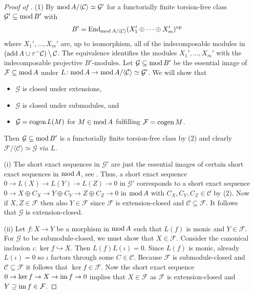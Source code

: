 \documentclass[a4paper]{amsart}
\newcommand{\op}{\textnormal{op}}
\renewcommand{\mod}{\textnormal{mod}\,}
\newcommand{\im}{\textnormal{im}\,}
\newcommand{\add}{\textnormal{add}\,}
\newcommand{\cogen}{\textnormal{cogen}\,}
\numberwithin{equation}{section} \theoremstyle{plain}
\numberwithin{thm}{section}
\begin{document}
\begin{proof}[Proof of ]  (1) By \cite[Theorem 5.1]{enomoto} $\mod A / \langle \mathcal{C} \rangle\simeq \mathcal{G}'$ for a functorially finite torsion-free class $\mathcal{G}' \subseteq \mod B'$ with 
\begin{align*}
B' = \mathrm{End}_{\mod A/\langle \mathcal{C} \rangle} (X_1' \oplus \dots \oplus X_m')^\op     
\end{align*}
where $X_1', \dots , X_m'$ are, up to isomorphism, all of the indecomposable modules in $(\add A \cup \tau^- \mathcal{C})\setminus \mathcal{C}$. The equivalence identifies the modules $X_1', \dots, X_m'$ with the indecomposable projective $B'$-modules. Let $\mathcal{G}\subseteq \mod B'$ be the essential image of $\mathcal{F} \subseteq \mod A$ under $L\colon \mod A \to \mod A / \langle \mathcal{C} \rangle \simeq \mathcal{G}'$. We will show that
\begin{itemize}
    \item[(i)] $\mathcal{G}$ is closed under extensions,
    \item[(ii)] $\mathcal{G}$ is closed under submodules, and
    \item[(iii)] $\mathcal{G} = \cogen L(M)$ for $M \in \mod A$ fulfilling $\mathcal{F} = \cogen M$.
\end{itemize}
Then $\mathcal{G} \subseteq \mod B'$ is a functorially finite torsion-free class by  (2) and clearly $\mathcal{F}/\langle \mathcal{C} \rangle \simeq \mathcal{G}$ via $L$. 

(i) The short exact sequences in $\mathcal{G}'$ are just the essential images of certain short exact sequences in $\mod A$, see \cite[Theorem B.2 and Proposition B.3]{enomoto}. Thus, a short exact sequence $0 \to L(X) \to L(Y) \to L(Z) \to 0 $ in $\mathcal{G}'$ corresponds to a short exact sequence $0 \to X \oplus C_X \to Y \oplus C_Y \to Z \oplus C_Z \to 0 $ in $\mod A$ with $C_X, C_Y, C_Z \in \mathcal{C}$ by  (2). Now if $X,Z \in \mathcal{F}$ then also $Y \in \mathcal{F}$ since $\mathcal{F}$ is extension-closed and $\mathcal{C} \subseteq \mathcal{F}$. It follows that $\mathcal{G}$ is extension-closed. 

(ii) Let $f\colon X\to Y$ be a morphism in $\mod A$ such that $L(f)$ is monic and $Y\in \mathcal{F}$. For $\mathcal{G}$ to be submodule-closed, we must show that $X\in \mathcal{F}$. Consider the canonical inclusion $\iota \colon \ker f \hookrightarrow X$. Then $L(f)L(\iota) = 0$. Since $L(f)$ is monic, already $L(\iota) = 0$ so $\iota$ factors through some $C\in \mathcal{C}$. Because $\mathcal{F}$ is submodule-closed and $\mathcal{C}\subseteq \mathcal{F}$ it follows that $\ker f \in \mathcal{F}$. Now the short exact sequence $0 \to \ker f \to X \to \im f \to 0$ implies that $X \in \mathcal{F}$ as $\mathcal{F}$ is extension-closed and $Y \supseteq \im f \in \mathcal{F}$.


\end{proof}
\end{document}
